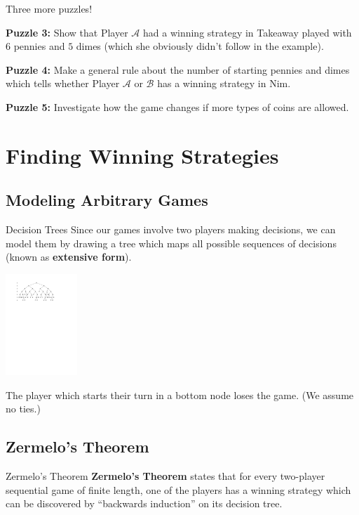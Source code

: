 \documentclass{beamer}
\theoremstyle{theorem}
\theoremstyle{definition}
\newcommand{\<}{\langle}
\renewcommand{\>}{\rangle}
\newcommand{\pl}[1]{\mathscr{#1}}
\newcommand{\vpause}{\pause\vspace{1em}}
\newcommand{\term}[1]{\textbf{#1}}
\begin{document}
\begin{frame}
  Three more puzzles!

  \vpause

  \textbf{Puzzle 3:} Show that Player $\pl A$ had a winning strategy
  in Takeaway played with $6$ pennies and $5$ dimes (which she obviously
  didn't follow in the example).

  \vpause

  \textbf{Puzzle 4:} Make a general rule about the number of starting pennies
  and dimes which tells whether Player $\pl A$ or $\pl B$ has a winning
  strategy in Nim.

  \vpause

  \textbf{Puzzle 5:} Investigate how the game changes if more types of coins
  are allowed.
\end{frame}

\section{Finding Winning Strategies}

\subsection{Modeling Arbitrary Games}

\begin{frame}{Decision Trees}
  Since our games involve two players making decisions, we can model them
  by drawing a tree which maps all possible sequences of decisions (known
  as \term{extensive form}).

  \centerline{
    \includegraphics[height=1.5in]{decisionTree1.pdf}
  }

  The player which starts their turn in a bottom node loses the game.
  (We assume no ties.)
\end{frame}

\subsection{Zermelo's Theorem}

\begin{frame}{Zermelo's Theorem}
  \term{Zermelo's Theorem} states that for every two-player sequential game
  of finite length, one of the players has a winning strategy which can be
  discovered by ``backwards induction'' on its decision tree.
\end{frame}
\end{document}
